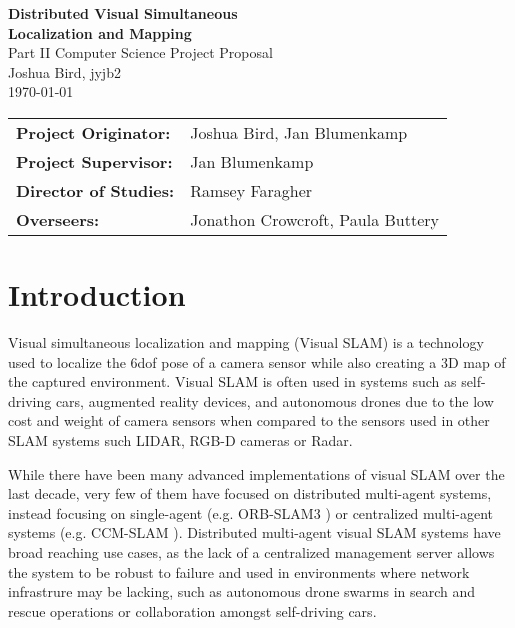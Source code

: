 \documentclass[12pt,a4paper,twoside]{article}
\begin{document}

\begin{titlepage} 

\vspace*{\fill}

\begin{center}
  \Huge
  \textbf{Distributed Visual Simultaneous \\ Localization and Mapping} \\[6mm]
  \Large
  Part II Computer Science Project Proposal \\[2mm]
  Joshua Bird, jyjb2 \\[2mm]
  \today \\[8mm]
\end{center}

\vspace{150pt}

{\large
\begin{tabular}{ll}
  \bf Project Originator:  & Joshua Bird, Jan Blumenkamp          \\[4mm]
  \bf Project Supervisor:  & Jan Blumenkamp                \\[4mm]
  \bf Director of Studies: & Ramsey Faragher                   \\[4mm]
  \bf Overseers:           & Jonathon Crowcroft, Paula Buttery
\end{tabular}
}

\vspace{170pt}

\end{titlepage}

\section{Introduction}

Visual simultaneous localization and mapping (Visual SLAM) is a technology used to localize the 6dof pose of a camera sensor while also creating a 3D map of the captured environment. Visual SLAM is often used in systems such as self-driving cars, augmented reality devices, and autonomous drones due to the low cost and weight of camera sensors when compared to the sensors used in other SLAM systems such LIDAR, RGB-D cameras or Radar.

While there have been many advanced implementations of visual SLAM over the last decade, very few of them have focused on distributed multi-agent systems, instead focusing on single-agent (e.g. ORB-SLAM3 \autocite{ORBSLAM3_TRO}) or centralized multi-agent systems (e.g. CCM-SLAM \autocite{schmuck2019ccm}). Distributed multi-agent visual SLAM systems have broad reaching use cases, as the lack of a centralized management server allows the system to be robust to failure and used in environments where network infrastrure may be lacking, such as autonomous drone swarms in search and rescue operations or collaboration amongst self-driving cars.
\end{document}
